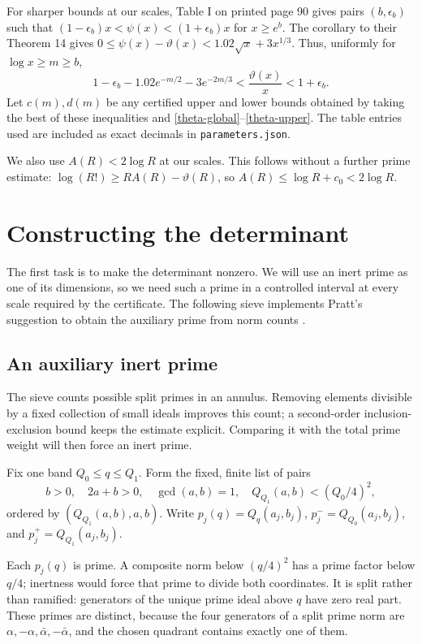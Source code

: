 \documentclass[11pt]{article}
\begin{document}
For sharper bounds at our scales, Table I on printed page 90 gives
pairs \((b,\epsilon_b)\) such that
\((1-\epsilon_b)x<\psi(x)<(1+\epsilon_b)x\) for \(x\ge e^b\).
The corollary to their Theorem 14 gives
\(0\le\psi(x)-\vartheta(x)<1.02\sqrt x+3x^{1/3}\).
Thus, uniformly for \(\log x\ge m\ge b\),
\begin{equation}\label{tabletheta}
 1-\epsilon_b-1.02e^{-m/2}-3e^{-2m/3}
 <\frac{\vartheta(x)}x<1+\epsilon_b.
\end{equation}
Let \(c(m),d(m)\) be any certified upper and lower bounds obtained
by taking the best of these inequalities and
\eqref{theta-global}--\eqref{theta-upper}. The table entries used are
included as exact decimals in \texttt{parameters.json}.

We also use \(A(R)<2\log R\) at our scales. This follows without a
further prime estimate: \(\log(R!)\ge RA(R)-\vartheta(R)\), so
\(A(R)\le\log R+c_0<2\log R\).

\section{Constructing the determinant}\label{determinant}
The first task is to make the determinant nonzero. We will use an inert
prime as one of its dimensions, so we need such a prime in a controlled
interval at every scale required by the certificate. The following sieve
implements Pratt's suggestion to obtain the auxiliary prime from norm
counts \cite{pratt}.

\subsection{An auxiliary inert prime}\label{sieve}
The sieve counts possible split primes in an annulus. Removing elements
divisible by a fixed collection of small ideals improves this count;
a second-order inclusion-exclusion bound keeps the estimate explicit.
Comparing it with the total prime weight will then force an inert prime.

Fix one band \(Q_0\le q\le Q_1\). Form the fixed, finite list of pairs
\begin{equation}\label{normlist}
 b>0,\quad 2a+b>0,\quad \gcd(a,b)=1,\quad
 Q_{Q_1}(a,b)<(Q_0/4)^2,
\end{equation}
ordered by \((Q_{Q_1}(a,b),a,b)\). Write \(p_j(q)=Q_q(a_j,b_j)\),
\(p_j^-=Q_{Q_0}(a_j,b_j)\), and \(p_j^+=Q_{Q_1}(a_j,b_j)\).

Each \(p_j(q)\) is prime. A composite norm below \((q/4)^2\) has a
prime factor below \(q/4\); inertness would force that prime to divide
both coordinates. It is split rather than ramified: generators of the
unique prime ideal above \(q\) have zero real part. These primes are
distinct, because the four generators of a split prime norm are
\(\alpha,-\alpha,\bar\alpha,-\bar\alpha\), and the chosen quadrant
contains exactly one of them.
\end{document}
